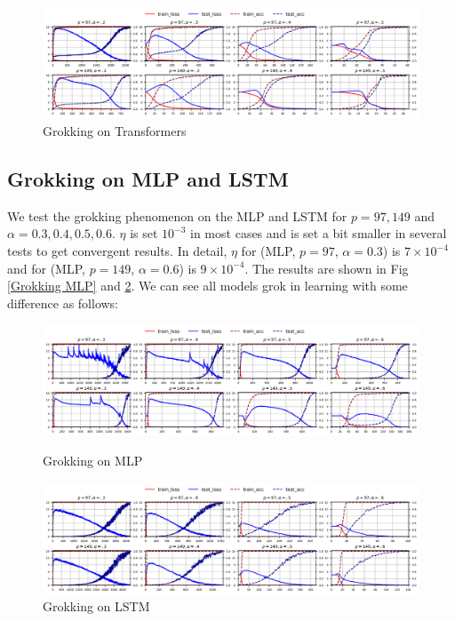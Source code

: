 \documentclass{article}
\begin{document}
\begin{figure}[htbp]
  \centering
  \includegraphics[width=\textwidth]{./pic/TSFM.png}
  \caption{Grokking on Transformers}
  \label{Grokking Transformers}
\end{figure}

\subsection{Grokking on MLP and LSTM}
\label{MLP}
We test the grokking phenomenon on the MLP and LSTM for $p = 97, 149$ and $\alpha = 0.3, 0.4, 0.5, 0.6$. $\eta$ is set $10^{-3}$ in most cases and is set a bit smaller in several tests to get convergent results. In detail, $\eta$ for (MLP, $p=97$, $\alpha=0.3$) is $7\times10^{-4}$ and for (MLP, $p=149$, $\alpha=0.6$) is $9\times10^{-4}$. The results are shown in Fig \ref{Grokking MLP} and \ref{Grokking LSTM}. We can see all models grok in learning with some difference as follows:

\begin{figure}[htbp]
  \centering
  \includegraphics[width=\textwidth]{./pic/MLP.png}
  \caption{Grokking on MLP}
  \label{Grokking MLP}

  \includegraphics[width=\textwidth]{./pic/LSTM.png}
  \caption{Grokking on LSTM}
  \label{Grokking LSTM}
\end{figure}
\end{document}

